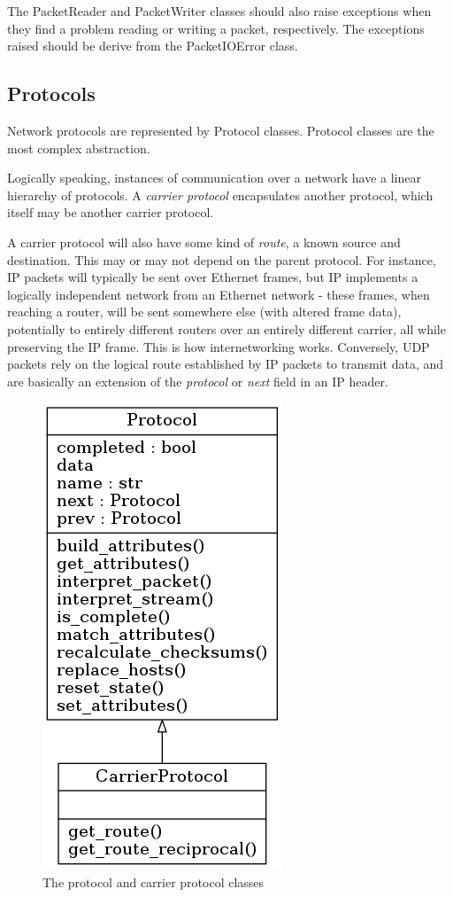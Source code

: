 \documentclass[10pt,a4paper,notitlepage]{report}
\begin{document}
The PacketReader and PacketWriter classes should also raise exceptions when they find a problem reading or writing a packet, respectively. The exceptions raised should be derive from the PacketIOError class.

\subsection{Protocols}
\label{sec:desproto}
Network protocols are represented by Protocol classes. Protocol classes are the most complex abstraction.

Logically speaking, instances of communication over a network have a linear hierarchy of protocols. A \emph{carrier protocol} encapsulates another protocol, which itself may be another carrier protocol.

A carrier protocol will also have some kind of \emph{route}, a known source and destination. This may or may not depend  on the parent protocol. For instance, IP packets will typically be sent over Ethernet frames, but IP implements a logically independent network from an Ethernet network - these frames, when reaching a router, will be sent somewhere else (with altered frame data), potentially to entirely different routers over an entirely different carrier, all while preserving the IP frame. This is how internetworking works. Conversely, UDP packets rely on the logical route established by IP packets to transmit data, and are basically an extension of the \emph{protocol} or \emph{next} field in an IP header.

\begin{figure}[H]
\center
\includegraphics[scale=0.7]{diagrams/protocol.png}
\caption{The protocol and carrier protocol classes}
\end{figure}
\end{document}
